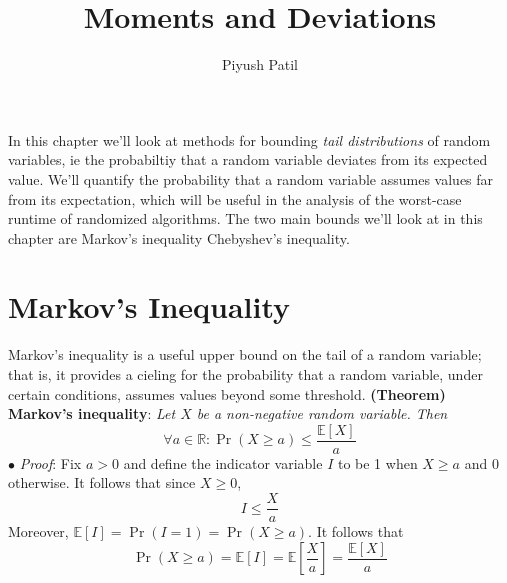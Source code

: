 \documentclass{article}
\newcommand*{\tb}{\textbf}
\newcommand*{\ti}{\textit}
\newcommand*{\nn}{\newline \newline}
\newcommand*{\Pf}{\indent \ensuremath{\bullet} \textit{Proof}: }
\newcommand*{\R}{\mathbb{R}}
\newcommand*{\E}{\mathbb{E}}
\begin{document}
\title{Moments and Deviations}
\author{Piyush Patil}
\maketitle

In this chapter we'll look at methods for bounding \ti{tail distributions} of random variables, ie the probabiltiy that a random variable deviates from its expected value. We'll quantify the probability that a random variable assumes values far from its expectation, which will be useful in the analysis of the worst-case runtime of randomized algorithms. The two main bounds we'll look at in this chapter are Markov's inequality Chebyshev's inequality.

\section{Markov's Inequality}
Markov's inequality is a useful upper bound on the tail of a random variable; that is, it provides a cieling for the probability that a random variable, under certain conditions, assumes values beyond some threshold.
\nn
\tb{(Theorem) Markov's inequality}: \ti{Let $ X $ be a non-negative random variable. Then}
$$ \forall a \in \R: \Pr(X \geq a) \leq \frac{\E[X]}{a} $$
\Pf Fix $ a > 0 $ and define the indicator variable $ I $ to be 1 when $ X \geq a $ and 0 otherwise. It follows that since $ X \geq 0 $,
$$ I \leq \frac{X}{a} $$
Moreover, $ \E[I] = \Pr(I = 1) = \Pr(X \geq a) $. It follows that
$$ \Pr(X \geq a) = \E[I] = \E \left[ \frac{X}{a} \right] = \frac{\E[X]}{a} $$
\qedsymbol
\end{document}
